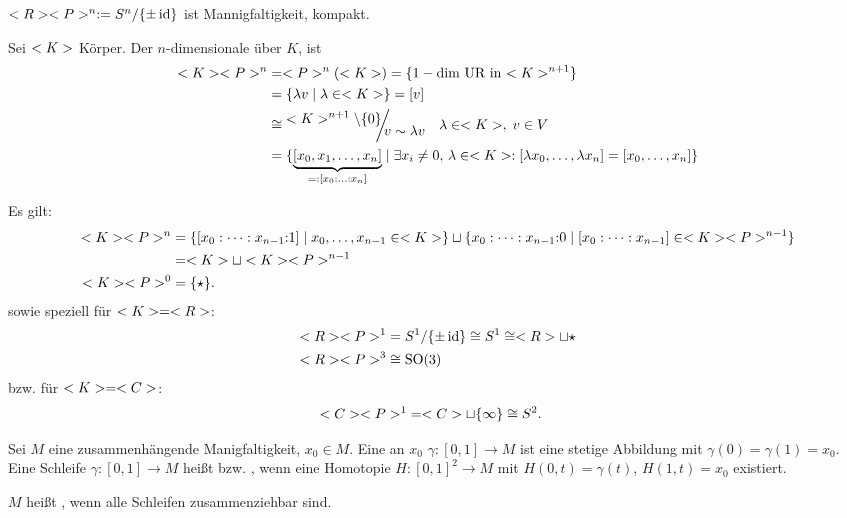 \begin{example}
\begin{enumerate}[label={(\arabic*)}]
		$<R> <P>^n := S^n\slash \{\pm \operatorname{id}\}$ ist Mannigfaltigkeit, kompakt.
	\end{enumerate}
\end{example}

\begin{definition}
	Sei $<K>$ Körper. Der $n$-dimensionale  über $K$, ist \begin{align*}
		\K \P^n &= \P^n(\K) = \{ 1-\text{dim UR in $\K^{n+1}$} \}\\
		 &= \{\lambda v\mid \lambda\in\K\} = [v]\\
		&\cong \raisebox{1ex}{$\displaystyle \K^{n+1}\setminus\{0\}$}\mskip-8mu\bigg\slash\mskip-8mu\raisebox{-1ex}{$\displaystyle v\sim \lambda v$}\quad \lambda\in\K,\;v\in V\\
		&= \{ \underbrace{[x_0,x_1,\dots,x_n]}_{=:[x_0:{\dots}:x_n]} \mid \exists x_i\neq 0,\,\lambda\in\K: [\lambda x_0,\dots,\lambda x_n] = [x_0,\dots,x_n] \}
	\end{align*}
\end{definition}
Es gilt:\begin{align*}
	 <K> <P>^n&= \{[x_0:\dots:x_{n-1}{:}1] \mid x_0,\dots,x_{n-1}\in <K> \}\sqcup \{x_0:\dots:x_{n-1}{:}0\mid [x_0:\dots:x_{n-1}]\in <K><P>^{n-1}\}\\
	 & = <K>\sqcup <K><P>^{n-1}\\
	 <K><P>^0 &= \{\star\}.\\
\end{align*}
sowie speziell für $<K>=<R>$:\begin{align*}
	<R><P>^1 &= S^1\slash \{\pm\operatorname{id}\} \cong S^1 \cong <R>\sqcup{\star}\\
	<R><P>^3 &\cong\operatorname{SO}(3)
\end{align*}
bzw. für $<K>=<C>$:\begin{align*}
	<C><P>^1 &=<C>\sqcup\{\infty\}\cong S^2.
\end{align*}

\begin{definition}
	Sei $M$ eine zusammenhängende Manigfaltigkeit, $x_0\in M$. Eine  an $x_0$ $\gamma\colon[0,1]\to M$ ist eine stetige Abbildung  mit $\gamma(0) = \gamma(1) = x_0$. Eine Schleife $\gamma\colon[0,1]\to M$ heißt  bzw. , wenn eine Homotopie $H\colon [0,1]^2\to M$ mit $H(0,t) = \gamma(t)$, $H(1,t) = x_0$ existiert.
\end{definition}

\begin{definition}
	$M$ heißt , wenn alle Schleifen zusammenziehbar sind.
\end{definition}

